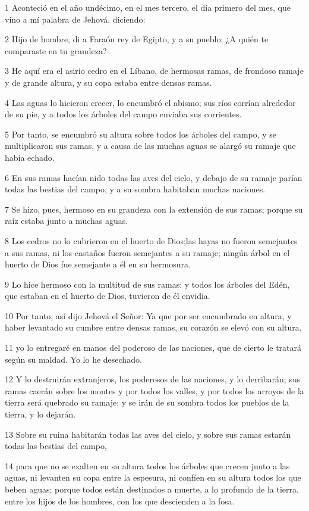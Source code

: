 \par 1 Aconteció en el año undécimo, en el mes tercero, el día primero del mes, que vino a mí palabra de Jehová, diciendo:
\par 2 Hijo de hombre, di a Faraón rey de Egipto, y a su pueblo: ¿A quién te comparaste en tu grandeza?
\par 3 He aquí era el asirio cedro en el Líbano, de hermosas ramas, de frondoso ramaje y de grande altura, y su copa estaba entre densas ramas.
\par 4 Las aguas lo hicieron crecer, lo encumbró el abismo; sus ríos corrían alrededor de su pie, y a todos los árboles del campo enviaba sus corrientes.
\par 5 Por tanto, se encumbró su altura sobre todos los árboles del campo, y se multiplicaron sus ramas, y a causa de las muchas aguas se alargó su ramaje que había echado.
\par 6 En sus ramas hacían nido todas las aves del cielo, y debajo de su ramaje parían todas las bestias del campo, y a su sombra habitaban muchas naciones.
\par 7 Se hizo, pues, hermoso en su grandeza con la extensión de sus ramas; porque su raíz estaba junto a muchas aguas.
\par 8 Los cedros no lo cubrieron en el huerto de Dios;las hayas no fueron semejantes a sus ramas, ni los castaños fueron semejantes a su ramaje; ningún árbol en el huerto de Dios fue semejante a él en su hermosura.
\par 9 Lo hice hermoso con la multitud de sus ramas; y todos los árboles del Edén, que estaban en el huerto de Dios, tuvieron de él envidia.
\par 10 Por tanto, así dijo Jehová el Señor: Ya que por ser encumbrado en altura, y haber levantado su cumbre entre densas ramas, su corazón se elevó con su altura,
\par 11 yo lo entregaré en manos del poderoso de las naciones, que de cierto le tratará según su maldad. Yo lo he desechado.
\par 12 Y lo destruirán extranjeros, los poderosos de las naciones, y lo derribarán; sus ramas caerán sobre los montes y por todos los valles, y por todos los arroyos de la tierra será quebrado su ramaje; y se irán de su sombra todos los pueblos de la tierra, y lo dejarán.
\par 13 Sobre su ruina habitarán todas las aves del cielo, y sobre sus ramas estarán todas las bestias del campo,
\par 14 para que no se exalten en su altura todos los árboles que crecen junto a las aguas, ni levanten su copa entre la espesura, ni confíen en su altura todos los que beben aguas; porque todos están destinados a muerte, a lo profundo de la tierra, entre los hijos de los hombres, con los que descienden a la fosa.
